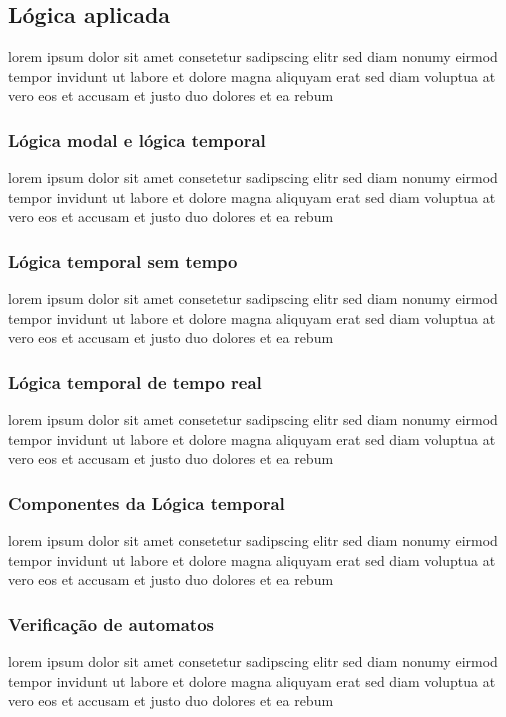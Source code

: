 \subsection{Lógica aplicada}
lorem ipsum dolor sit amet consetetur sadipscing elitr sed diam nonumy
eirmod tempor invidunt ut labore et dolore magna aliquyam erat sed diam
voluptua at vero eos et accusam et justo duo dolores et ea rebum

\subsubsection{Lógica modal e lógica temporal}
lorem ipsum dolor sit amet consetetur sadipscing elitr sed diam nonumy
eirmod tempor invidunt ut labore et dolore magna aliquyam erat sed diam
voluptua at vero eos et accusam et justo duo dolores et ea rebum

\subsubsection{Lógica temporal sem tempo}
lorem ipsum dolor sit amet consetetur sadipscing elitr sed diam nonumy
eirmod tempor invidunt ut labore et dolore magna aliquyam erat sed diam
voluptua at vero eos et accusam et justo duo dolores et ea rebum

\subsubsection{Lógica temporal de tempo real}
lorem ipsum dolor sit amet consetetur sadipscing elitr sed diam nonumy
eirmod tempor invidunt ut labore et dolore magna aliquyam erat sed diam
voluptua at vero eos et accusam et justo duo dolores et ea rebum

\subsubsection{Componentes da Lógica temporal}
lorem ipsum dolor sit amet consetetur sadipscing elitr sed diam nonumy
eirmod tempor invidunt ut labore et dolore magna aliquyam erat sed diam
voluptua at vero eos et accusam et justo duo dolores et ea rebum

\subsubsection{Verificação de automatos}
lorem ipsum dolor sit amet consetetur sadipscing elitr sed diam nonumy
eirmod tempor invidunt ut labore et dolore magna aliquyam erat sed diam
voluptua at vero eos et accusam et justo duo dolores et ea rebum


